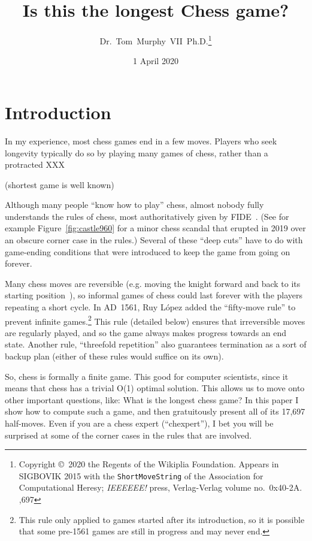 \documentclass[twocolumn]{article}
\begin{document}
 

\title{Is this the longest Chess game?}
\author{Dr.~Tom~Murphy~VII~Ph.D.\thanks{
Copyright \copyright\ 2020 the Regents of the Wikiplia
Foundation. Appears in SIGBOVIK 2015 with the {\tt ShortMoveString} of the
Association for Computational Heresy; {\em IEEEEEE!} press,
Verlag-Verlag volume no.~0x40-2A.
,697
}
}

\renewcommand\>{$>$}
\newcommand\<{$<$}

\date{1 April 2020}

\maketitle

\section{Introduction}

In my experience, most chess games end in a few moves. Players who
seek longevity typically do so by playing many games of chess, rather
than a protracted XXX

(shortest game is well known)

Although many people ``know how to play'' chess, almost nobody fully
understands the rules of chess, most authoritatively given by
FIDE~\cite{fiderules}. (See for example Figure~\ref{fig:castle960} for
a minor chess scandal that erupted in 2019 over an obscure corner case
in the rules.) Several of these ``deep cuts'' have to do with game-ending
conditions that were introduced to keep the game from going on forever.

Many chess moves are reversible (e.g. moving the knight forward and
back to its starting position~\cite{survival}), so informal games of
chess could last forever with the players repeating a short cycle. In
AD~1561, Ruy L\'opez added the ``fifty-move rule'' to prevent infinite
games.\footnote{This rule only applied to games started after its
  introduction, so it is possible that some pre-1561 games are still
  in progress and may never end.} This rule (detailed below) ensures
that irreversible moves are regularly played, and so the game always
makes progress towards an end state. Another rule, ``threefold
repetition'' also guarantees termination as a sort of backup plan
(either of these rules would suffice on its own).

So, chess is formally a finite game. This good for computer
scientists, since it means that chess has a trivial O(1) optimal
solution. This allows us to move onto other important questions, like:
What is the longest chess game? In this paper I show how to compute
such a game, and then gratuitously present all of its
17,697 
%
half-moves. Even if you are a chess expert (``chexpert''), I bet you
will be surprised at some of the corner cases in the rules that are
involved.
\end{document}
